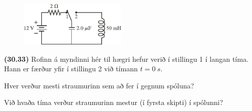 \begin{enumerate}[label = \textbf{(\alph*)}]
\begin{minipage}{\linewidth}
\begin{figure}
\vspace{-0.5cm}
\includegraphics[width = 2in]{figures/rk3033c.pdf}
\end{figure}

\item[\textbf{(30.33)}] Rofinn á myndinni hér til hægri hefur verið í stillingu 1 í langan tíma. Hann er færður yfir í stillingu 2 við tímann $t = \SI{0}{s}$. \begin{enumerate*}[label = \textbf{(\alph*)}]
    \item Hver verður mesti straumurinn sem að fer í gegnum spóluna?
    \item Við hvaða tíma verður straumurinn mestur (í fyrsta skipti) í spólunni?
\end{enumerate*}

\vspace{1cm}

\end{minipage}

\end{enumerate}

